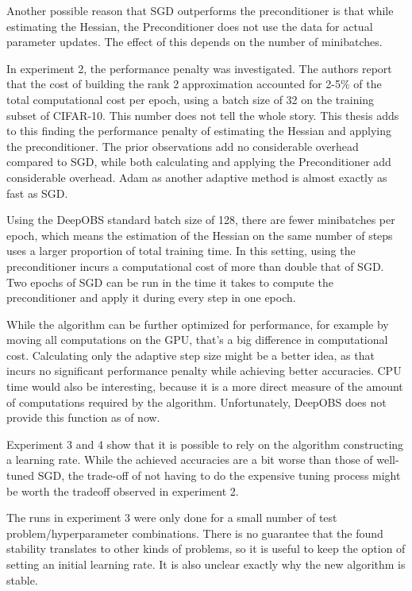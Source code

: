 \documentclass[twoside,12pt,a4paper]{report}
\begin{document}
Another possible reason that SGD outperforms the preconditioner is that while estimating the Hessian, the Preconditioner does not use the data for actual parameter updates. The effect of this depends on the number of minibatches.


In experiment 2, the performance penalty was investigated. The authors report that the cost of building the rank 2 approximation accounted for 2-5\% of the total computational cost per epoch, using a batch size of 32 on the training subset of CIFAR-10. This number does not tell the whole story. This thesis adds to this finding the performance penalty of estimating the Hessian and applying the preconditioner. The prior observations add no considerable overhead compared to SGD, while both calculating and applying the Preconditioner add considerable overhead. Adam as another adaptive method is almost exactly as fast as SGD.

Using the DeepOBS standard batch size of 128, there are fewer minibatches per epoch, which means the estimation of the Hessian on the same number of steps uses a larger proportion of total training time. In this setting, using the preconditioner incurs a computational cost of more than double that of SGD. Two epochs of SGD can be run in the time it takes to compute the preconditioner and apply it during every step in one epoch.

While the algorithm can be further optimized for performance, for example by moving all computations on the GPU, that's a big difference in computational cost. Calculating only the adaptive step size might be a better idea, as that incurs no significant performance penalty while achieving better accuracies.
CPU time would also be interesting, because it is a more direct measure of the amount of computations required by the algorithm. Unfortunately, DeepOBS does not provide this function as of now.

Experiment 3 and 4 show that it is possible to rely on the algorithm constructing a learning rate. While the achieved accuracies are a bit worse than those of well-tuned SGD, the trade-off of not having to do the expensive tuning process might be worth the tradeoff observed in experiment 2.

The runs in experiment 3 were only done for a small number of test problem/hyperparameter combinations. There is no guarantee that the found stability translates to other kinds of problems, so it is useful to keep the option of setting an initial learning rate. It is also unclear exactly why the new algorithm is stable.
\end{document}
